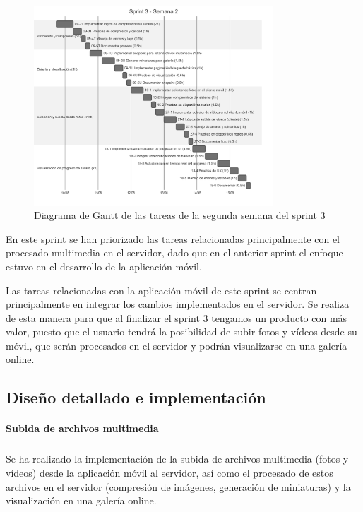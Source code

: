\begin{figure}[H]
    \begin{center}
        \includegraphics[width=0.8\textwidth]{assets/sprint3/week2-gantt.png}
    \end{center}
    \caption{Diagrama de Gantt de las tareas de la segunda semana del sprint 3}\label{fig:gantt-sprint3-week2}
\end{figure}

En este sprint se han priorizado las tareas relacionadas principalmente con el procesado multimedia en el servidor, dado que en el anterior sprint el enfoque estuvo en el desarrollo de la aplicación móvil.

Las tareas relacionadas con la aplicación móvil de este sprint se centran principalmente en integrar los cambios implementados en el servidor.
Se realiza de esta manera para que al finalizar el sprint 3 tengamos un producto con más valor, puesto que el usuario tendrá la posibilidad de subir fotos y vídeos desde su móvil, que serán procesados en el servidor y podrán visualizarse en una galería online.

\subsection{Diseño detallado e implementación}
\paragraph{Subida de archivos multimedia}
\subparagraph{}

Se ha realizado la implementación de la subida de archivos multimedia (fotos y vídeos) desde la aplicación móvil al servidor, así como el procesado de estos archivos en el servidor (compresión de imágenes, generación de miniaturas) y la visualización en una galería online.

